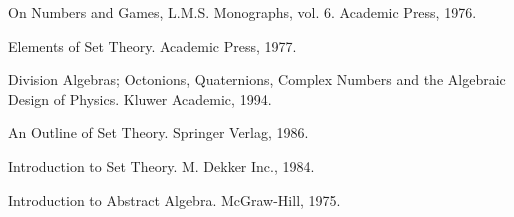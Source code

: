 \Ref

     {On Numbers and Games, L.M.S. Monographs, vol. 6.}
     {Academic Press, 1976.}

     {Elements of Set Theory.}
     {Academic Press, 1977.}

     {Division Algebras; Octonions, Quaternions, Complex Numbers and the
     Algebraic Design of Physics.}
     {Kluwer Academic, 1994.}

     {An Outline of Set Theory.}
     {Springer Verlag, 1986.}

     {Introduction to Set Theory.}
     {M. Dekker Inc., 1984.}

     {Introduction to Abstract Algebra.}
     {McGraw-Hill, 1975.}

%

